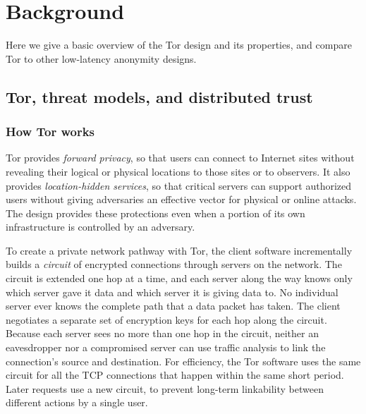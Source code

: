 \documentclass{llncs}
\begin{document}
\section{Background}
Here we give a basic overview of the Tor design and its properties, and
compare Tor to other low-latency anonymity designs.

\subsection{Tor, threat models, and distributed trust}
\label{sec:what-is-tor}


\subsubsection{How Tor works}
Tor provides \emph{forward privacy}, so that users can connect to
Internet sites without revealing their logical or physical locations
to those sites or to observers.  It also provides \emph{location-hidden
services}, so that critical servers can support authorized users without
giving adversaries an effective vector for physical or online attacks.
The design provides these protections even when a portion of its own
infrastructure is controlled by an adversary.

To create a private network pathway with Tor, the client software
incrementally builds a \emph{circuit} of encrypted connections through
servers on the network. The circuit is extended one hop at a time, and
each server along the way knows only which server gave it data and which
server it is giving data to. No individual server ever knows the complete
path that a data packet has taken. The client negotiates a separate set
of encryption keys for each hop along the circuit.%
Because each server sees no more than one hop in the
circuit, neither an eavesdropper nor a compromised server can use traffic
analysis to link the connection's source and destination.
For efficiency, the Tor software uses the same circuit for all the TCP
connections that happen within the same short period.
Later requests use a new
circuit, to prevent long-term linkability between different actions by
a single user.
\end{document}
